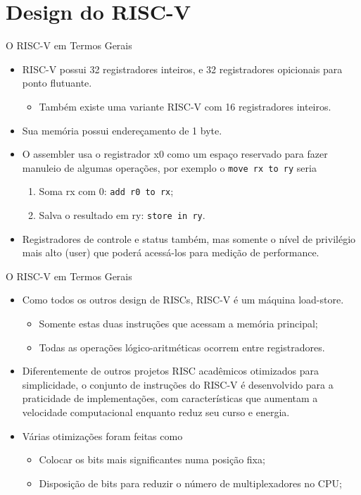 \documentclass[aspectratio=169]{beamer}
\begin{document}
\section{Design do RISC-V}
\begin{frame}{O RISC-V em Termos Gerais}
	\begin{itemize}
		\item RISC-V possui 32 registradores inteiros, e 32 registradores opicionais para ponto flutuante.
		\begin{itemize}
			\item Também existe uma variante RISC-V com 16 registradores inteiros.
		\end{itemize}

		\item Sua memória possui endereçamento de 1 byte.

		\item O assembler usa o registrador x0 como um espaço reservado para fazer manuleio de algumas operações, por exemplo o \texttt{move rx to ry} seria
		\begin{enumerate}
			\item Soma rx com 0: \texttt{add r0 to rx};
			\item Salva o resultado em ry: \texttt{store in ry}.
		\end{enumerate}

		\item Registradores de controle e status também, mas somente o nível de privilégio mais alto (user) que poderá acessá-los para medição de performance.
	\end{itemize}
\end{frame}


\begin{frame}{O RISC-V em Termos Gerais}
	\begin{itemize}
		\item Como todos os outros design de RISCs, RISC-V é um máquina load-store.
		\begin{itemize}
			\item Somente estas duas instruções que acessam a memória principal;
			\item Todas as operações lógico-aritméticas ocorrem entre registradores.
		\end{itemize}

		\item Diferentemente de outros projetos RISC acadêmicos otimizados para simplicidade, o conjunto de instruções do RISC-V é desenvolvido para a praticidade de implementações, com características que aumentam a velocidade computacional enquanto reduz seu curso e energia.

		\item Várias otimizações foram feitas como
		\begin{itemize}
			\item Colocar os bits mais significantes numa posição fixa;
			\item Disposição de bits para reduzir o número de multiplexadores no CPU;
		\end{itemize}

	\end{itemize}
\end{frame}
\end{document}
